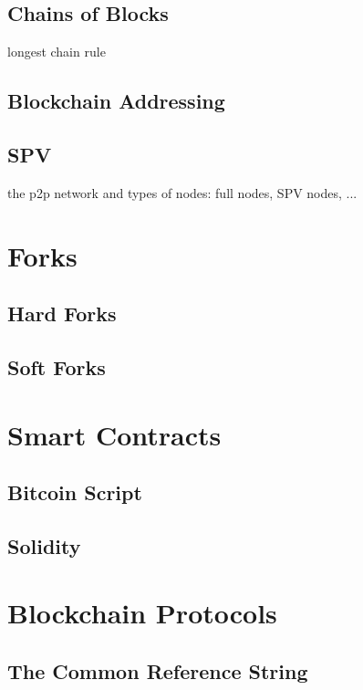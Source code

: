 \subsection{Chains of Blocks}
longest chain rule
\subsection{Blockchain Addressing}
\subsection{SPV}
the p2p network and types of nodes: full nodes, SPV nodes, ...

\section{Forks}
\subsection{Hard Forks}
\subsection{Soft Forks}

\section{Smart Contracts}
\subsection{Bitcoin Script}
\subsection{Solidity}

\section{Blockchain Protocols}



\subsection{The Common Reference String}


